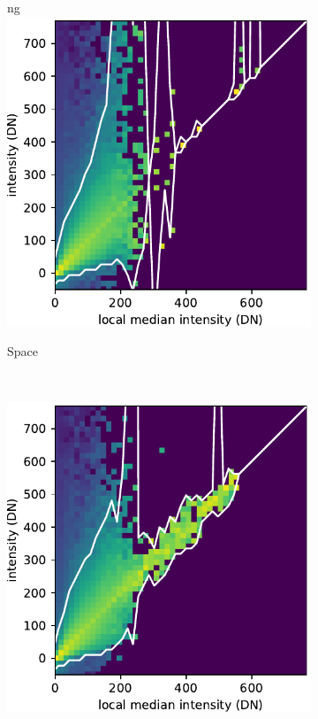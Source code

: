\documentclass[10pt,letterpaper]{article}
\begin{document}
\begin{figure}[t!]
\begin{subfigure}[t]{0.288\textwidth}
ng
					\includegraphics[width=\textwidth]{fig/hist_1}
					\caption{Space}
				\end{subfigure}
				~ 
				\begin{subfigure}[t]{0.288\textwidth}
					\centering
					\includegraphics[width=\textwidth]{fig/hist_2}

\end{subfigure}
\end{figure}
\end{document}
